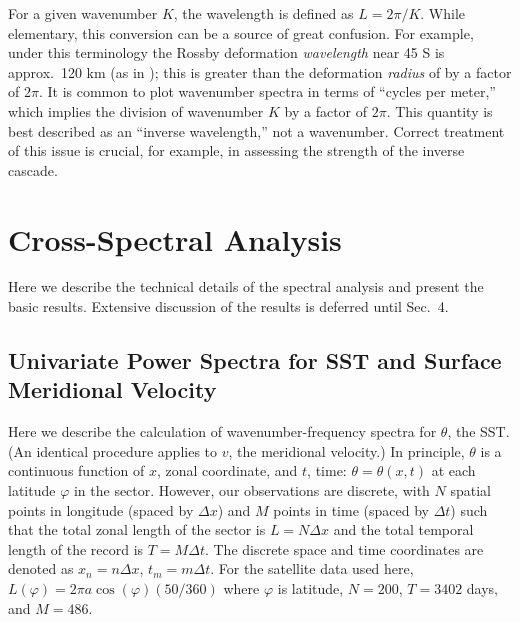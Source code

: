 \documentclass[10pt]{article}
\begin{document}
For a given wavenumber $K$, the wavelength is defined as $L = 2 \pi / K$. While elementary, this conversion can be a source of great confusion. For example, under this terminology  the Rossby deformation {\em wavelength} near 45 S is approx.~120 km (as in \citealt{TullochEtAl2009}); this is greater than the deformation {\em radius} of \citet{CheltonEtAl1998} by a factor of $2 \pi$. It is common to plot wavenumber spectra in terms of ``cycles per meter,'' which implies the division of wavenumber $K$ by a factor of $2 \pi$. This quantity is best described as an ``inverse wavelength,'' not a wavenumber. Correct treatment of this issue is crucial, for example, in assessing the strength of the inverse cascade.



\section{Cross-Spectral Analysis}

Here we describe the technical details of the spectral analysis and present the basic results. Extensive discussion of the results is deferred until Sec.~4.

\subsection{Univariate Power Spectra for SST and Surface Meridional Velocity}

Here we describe the calculation of wavenumber-frequency spectra for $\theta$, the SST. (An identical procedure applies to $v$, the meridional velocity.) In principle, $\theta$ is a continuous function of $x$, zonal coordinate, and $t$, time: $\theta = \theta(x,t)$ at each latitude $\varphi$ in the sector. However, our observations are discrete, with $N$ spatial points in longitude (spaced by $\Delta x$) and $M$ points in time (spaced by $\Delta t$) such that the total zonal length of the sector is $L = N \Delta x$ and the total temporal length of the record is $T = M \Delta t$. The discrete space and time coordinates are denoted as $x_n = n \Delta x$, $t_m = m \Delta t$. For the satellite data used here, $L(\varphi) = 2 \pi a \cos(\varphi) (50/360)$ where $\varphi$ is latitude, $N = 200$, $T = 3402$ days, and $M = 486$.
\end{document}
